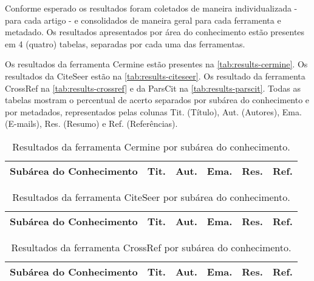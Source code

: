 
Conforme esperado os resultados foram coletados de maneira individualizada - para cada artigo - e consolidados de maneira geral para cada ferramenta e metadado. Os resultados apresentados por área do conhecimento estão presentes em 4 (quatro) tabelas, separadas por cada uma das ferramentas. 

Os resultados da ferramenta Cermine estão presentes na \autoref{tab:results-cermine}. Os resultados da CiteSeer estão na \autoref{tab:results-citeseer}. Os resultado da ferramenta CrossRef na \autoref{tab:results-crossref} e da ParsCit na \autoref{tab:results-parscit}. Todas as tabelas mostram o percentual de acerto separados por subárea do conhecimento e por metadados, representados pelas colunas Tit. (Título),  Aut. (Autores), Ema. (E-mails), Res. (Resumo) e Ref. (Referências).

\begin{table}[h!]
    \caption{Resultados da ferramenta Cermine por subárea do conhecimento.}
    \begin{center}
        \begin{tabular}{|p{6cm}|C{1.2cm}|C{1.2cm}|C{1.2cm}|C{1.2cm}|C{1.2cm}|}
            \hline 
            \textbf{Subárea do Conhecimento} & \textbf{Tit.} & \textbf{Aut.} & \textbf{Ema.} & \textbf{Res.} & \textbf{Ref.} \\ \hline 
            
        \end{tabular}
    \end{center}
    \label{tab:results-cermine}
\end{table}

\begin{table}[h!]
    \caption{Resultados da ferramenta CiteSeer por subárea do conhecimento.}
    \begin{center}
        \begin{tabular}{|p{6cm}|C{1.2cm}|C{1.2cm}|C{1.2cm}|C{1.2cm}|C{1.2cm}|}
            \hline 
            \textbf{Subárea do Conhecimento} & \textbf{Tit.} & \textbf{Aut.} & \textbf{Ema.} & \textbf{Res.} & \textbf{Ref.} \\ \hline 
            
        \end{tabular}
    \end{center}
    \label{tab:results-citeseer}
\end{table}

\begin{table}[h!]
    \caption{Resultados da ferramenta CrossRef por subárea do conhecimento.}
    \begin{center}
        \begin{tabular}{|p{6cm}|C{1.2cm}|C{1.2cm}|C{1.2cm}|C{1.2cm}|C{1.2cm}|}
            \hline 
            \textbf{Subárea do Conhecimento} & \textbf{Tit.} & \textbf{Aut.} & \textbf{Ema.} & \textbf{Res.} & \textbf{Ref.} \\ \hline 
            
        \end{tabular}
    \end{center}
    \label{tab:results-crossref}
\end{table}

